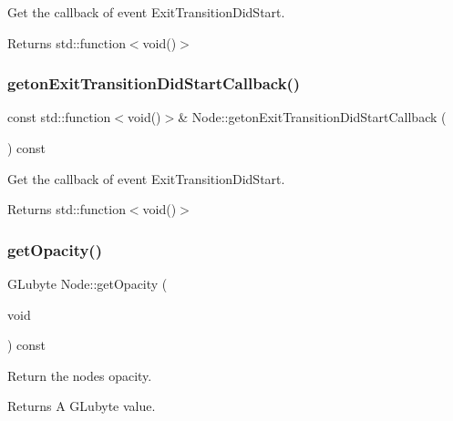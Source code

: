 Get the callback of event Exit\+Transition\+Did\+Start. \begin{DoxyReturn}{Returns}
std\+::function$<$void()$>$ 
\end{DoxyReturn}
\mbox{\label{classNode_a306d572d520d31dd83ed3eedd2b78d4e}} 
\subsubsection{\texorpdfstring{geton\+Exit\+Transition\+Did\+Start\+Callback()}{getonExitTransitionDidStartCallback()}\hspace{0.1cm}{\footnotesize\ttfamily [2/2]}}
{\footnotesize\ttfamily const std\+::function$<$void()$>$\& Node\+::geton\+Exit\+Transition\+Did\+Start\+Callback (\begin{DoxyParamCaption}{ }\end{DoxyParamCaption}) const\hspace{0.3cm}{\ttfamily [inline]}}

Get the callback of event Exit\+Transition\+Did\+Start. \begin{DoxyReturn}{Returns}
std\+::function$<$void()$>$ 
\end{DoxyReturn}
\mbox{\label{classNode_ab999cce3763ea09e74014245c770ea97}} 
\subsubsection{\texorpdfstring{get\+Opacity()}{getOpacity()}\hspace{0.1cm}{\footnotesize\ttfamily [1/2]}}
{\footnotesize\ttfamily G\+Lubyte Node\+::get\+Opacity (\begin{DoxyParamCaption}\item[{void}]{ }\end{DoxyParamCaption}) const\hspace{0.3cm}{\ttfamily [virtual]}}

Return the node\textquotesingle{}s opacity. \begin{DoxyReturn}{Returns}
A G\+Lubyte value. 
\end{DoxyReturn}


